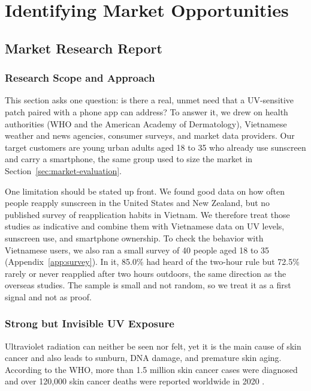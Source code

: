 \section{Identifying Market Opportunities}\label{sec:market-opportunities}

\subsection{Market Research Report}

\subsubsection{Research Scope and Approach}
This section asks one question: is there a real, unmet need that a UV-sensitive
patch paired with a phone app can address? To answer it, we drew on health
authorities (WHO and the American Academy of Dermatology), Vietnamese weather and
news agencies, consumer surveys, and market data providers. Our target customers
are young urban adults aged 18 to 35 who already use sunscreen and carry a
smartphone, the same group used to size the market in
Section~\ref{sec:market-evaluation}.

One limitation should be stated up front. We found good data on how often people
reapply sunscreen in the United States and New Zealand, but no published survey of
reapplication habits in Vietnam. We therefore treat those studies as indicative
and combine them with Vietnamese data on UV levels, sunscreen use, and smartphone
ownership. To check the behavior with Vietnamese users, we also ran a small survey of 40
people aged 18 to 35 (Appendix~\ref{app:survey}). In it, 85.0\% had heard of the two-hour
rule but 72.5\% rarely or never reapplied after two hours outdoors, the same direction as the
overseas studies. The sample is small and not random, so we treat it as a first signal and not
as proof.

\subsubsection{Strong but Invisible UV Exposure}
Ultraviolet radiation can neither be seen nor felt, yet it is the main cause of
skin cancer and also leads to sunburn, DNA damage, and premature skin aging.
According to the WHO, more than 1.5 million skin cancer cases were diagnosed and
over 120,000 skin cancer deaths were reported worldwide in 2020 \cite{whofact}.


